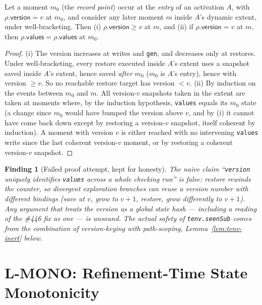 \documentclass[11pt]{article}
\newtheorem{finding}[theorem]{Finding}
\begin{document}
\begin{lemma}
\label{lem:version-values}
Let a moment $m_0$ (the \emph{record point}) occur at the \emph{entry} of
an activation $A$, with $\rho.\mathsf{version} = v$ at $m_0$, and
consider any later moment $m$ inside $A$'s dynamic extent, under
well-bracketing. Then (i) $\rho.\mathsf{version} \geq v$ at $m$, and (ii)
if $\rho.\mathsf{version} = v$ at $m$, then
$\rho.\mathsf{values} = \rho.\mathsf{values}\text{ at } m_0$.
\end{lemma}
\begin{proof}
(i) The version increases at writes and \texttt{gen}, and decreases only
at restores. Under well-bracketing, every restore executed inside $A$'s
extent uses a snapshot saved inside $A$'s extent, hence saved \emph{after}
$m_0$ ($m_0$ is $A$'s entry), hence with version $\geq v$. So no reachable
restore target has version $< v$.
(ii) By induction on the events between $m_0$ and $m$. All version-$v$
snapshots taken in the extent are taken at moments where, by the
induction hypothesis, \texttt{values} equals its $m_0$ state (a change
since $m_0$ would have bumped the version above $v$, and by (i) it cannot
have come back down except by restoring a version-$v$ snapshot, itself
coherent by induction). A moment with version $v$ is either reached
with no intervening \texttt{values} write since the last coherent
version-$v$ moment, or by restoring a coherent version-$v$ snapshot.
\end{proof}

\begin{finding}[Failed proof attempt, kept for honesty]
\label{find:version-collision}
The naive claim ``\texttt{version} uniquely identifies \texttt{values}
across a whole checking run'' is \emph{false}: restore rewinds the
counter, so divergent exploration branches can reuse a version number
with different bindings (save at $v$, grow to $v{+}1$, restore, grow
differently to $v{+}1$). Any argument that treats the version as a global
state hash — including a reading of the \#446 fix as one — is unsound.
The actual safety of \texttt{tenv.seenSub} comes from the
\emph{combination} of version-keying with path-scoping,
Lemma~\ref{lem:tenv-inert} below.
\end{finding}

\section{L-MONO: Refinement-Time State Monotonicity}
\label{sec:lmono}
\end{document}
